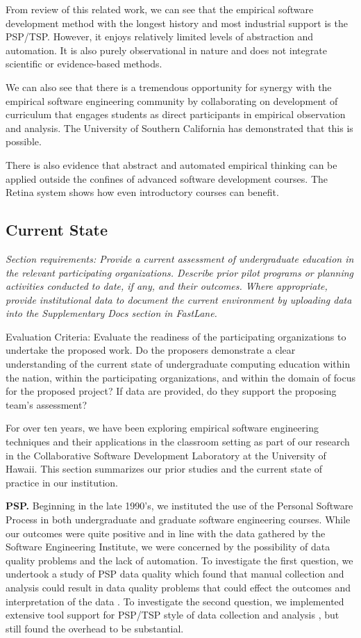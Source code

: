 From review of this related work, we can see that the empirical software
development method with the longest history and most industrial support is
the PSP/TSP.  However, it enjoys relatively limited levels of abstraction
and automation.  It is also purely observational in nature and does not
integrate scientific or evidence-based methods.

We can also see that there is a tremendous opportunity for synergy with the
empirical software engineering community by collaborating on development of
curriculum that engages students as direct participants in empirical
observation and analysis.  The University of Southern California has
demonstrated that this is possible.

There is also evidence that abstract and automated empirical thinking can
be applied outside the confines of advanced software development courses.
The Retina system shows how even introductory courses can benefit.


\subsection{Current State}

{\em Section requirements: Provide a current assessment of undergraduate
education in the relevant participating organizations.  Describe prior
pilot programs or planning activities conducted to date, if any, and their
outcomes.  Where appropriate, provide institutional data to document the
current environment by uploading data into the Supplementary Docs section
in FastLane.

Evaluation Criteria: Evaluate the readiness of the participating
organizations to undertake the proposed work.  Do the proposers demonstrate
a clear understanding of the current state of undergraduate computing
education within the nation, within the participating organizations, and
within the domain of focus for the proposed project?  If data are provided,
do they support the proposing team's assessment?}
\bigskip

For over ten years, we have been exploring empirical software engineering
techniques and their applications in the classroom setting as part of our
research in the Collaborative Software Development Laboratory at the
University of Hawaii.  This section summarizes our prior studies and the
current state of practice in our institution.

{\bf PSP.} Beginning in the late 1990's, we instituted the use
of the Personal Software Process in both undergraduate and graduate
software engineering courses.  While our outcomes were quite positive and
in line with the data gathered by the Software Engineering Institute, we
were concerned by the possibility of data quality problems and the lack of
automation.  To investigate the first question, we undertook a study of PSP
data quality which found that manual collection and analysis could result
in data quality problems that could effect the outcomes and interpretation
of the data \citep{csdl-98-13,csdl-98-11}.  To investigate the second question, we
implemented extensive tool support for PSP/TSP style of data collection and
analysis \citep{csdl2-00-03}, but still found the overhead to be
substantial\citep{csdl2-01-12}. 

